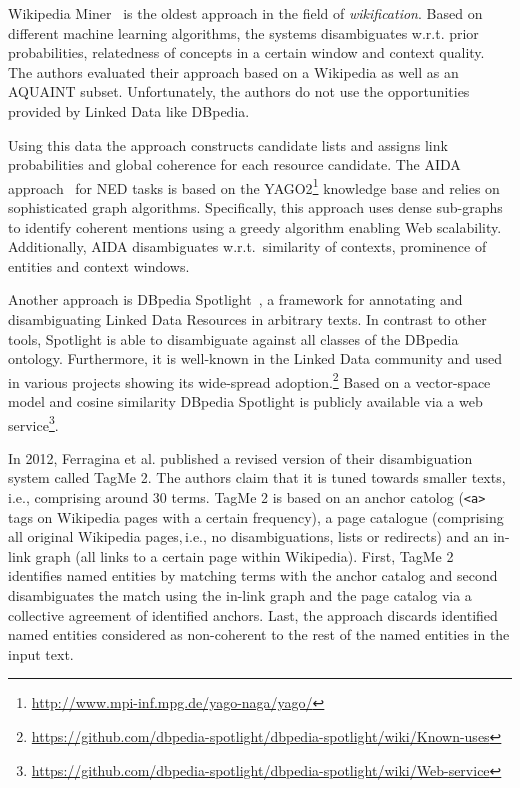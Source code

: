 Wikipedia Miner~\cite{milne2008learning} is the oldest approach in the field of \emph{wikification}.
Based on different machine learning algorithms, the systems disambiguates w.r.t. prior probabilities, relatedness of concepts in a certain window and context quality. 
The authors evaluated their approach based on a Wikipedia as well as an AQUAINT subset. 
Unfortunately, the authors do not use the opportunities provided by Linked Data like DBpedia.

Using this data the approach constructs candidate lists and assigns link probabilities and global coherence for each resource candidate.
The AIDA approach~\cite{AIDA} for \ac{NED} tasks is based on the YAGO2\footnote{\url{http://www.mpi-inf.mpg.de/yago-naga/yago/}} knowledge base and relies on sophisticated graph algorithms. 
Specifically, this approach uses dense sub-graphs to identify coherent mentions using a greedy algorithm enabling Web scalability. 
Additionally, AIDA disambiguates w.r.t.~similarity of contexts, prominence of entities and context windows.

Another approach is DBpedia Spotlight~\cite{spotlight}, a framework for annotating and disambiguating Linked Data Resources in arbitrary texts.
In contrast to other tools, Spotlight is able to disambiguate against all classes of the DBpedia ontology.
Furthermore, it is well-known in the Linked Data community and used in various projects showing its wide-spread adoption.\footnote{\url{https://github.com/dbpedia-spotlight/dbpedia-spotlight/wiki/Known-uses}}
Based on a vector-space model and cosine similarity DBpedia Spotlight is publicly available via a web service\footnote{\url{https://github.com/dbpedia-spotlight/dbpedia-spotlight/wiki/Web-service}}.

In 2012, Ferragina et al. published a revised version of their disambiguation system called TagMe 2.
The authors claim that it is tuned towards smaller texts,\,i.e., comprising around 30 terms.
TagMe 2 is based on an anchor catolog (\texttt{<a>} tags on Wikipedia pages with a certain frequency), a page catalogue (comprising all original Wikipedia pages,\,i.e., no disambiguations, lists or redirects) and an in-link graph (all links to a certain page within Wikipedia).
First, TagMe 2 identifies named entities by matching terms with the anchor catalog and second disambiguates the match using the in-link graph and the page catalog via a collective agreement of identified anchors. 
Last, the approach discards identified named entities considered as non-coherent to the rest of the named entities in the input text.  

